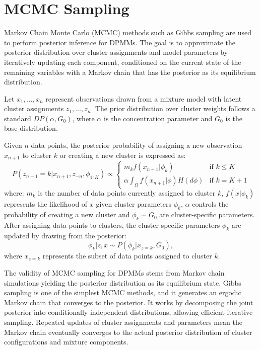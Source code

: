 
\section{MCMC Sampling}
Markov Chain Monte Carlo (MCMC) methods such as Gibbs sampling are used to perform posterior inference for DPMMs. The goal is to approximate the posterior distribution over cluster assignments and model parameters by iteratively updating each component, conditioned on the current state of the remaining variables with a Markov chain that has the posterior as its equilibrium distribution.\cite{neal2000markov}

Let \( x_1, \dots, x_n \) represent observations drawn from a mixture model with latent cluster assignments \( z_1, \dots, z_n \). The prior distribution over cluster weights follows a standard \( DP(\alpha, G_0) \), where \( \alpha \) is the concentration parameter and \( G_0 \) is the base distribution.

Given \( n \) data points, the posterior probability of assigning a new observation \( x_{n+1} \) to cluster \( k \) or creating a new cluster is expressed as:
\[
P(z_{n+1} = k | x_{n+1}, z_{-n}, \phi_{1:K}) \propto
\begin{cases}
m_k f(x_{n+1} | \phi_k) & \text{if } k \leq K \\
\alpha \int_{\Omega} f(x_{n+1} | \phi) H(d\phi) & \text{if } k = K+1
\end{cases}
\]
where: \( m_k \) is the number of data points currently assigned to cluster \( k \), \( f(x | \phi_k) \) represents the likelihood of \( x \) given cluster parameters \( \phi_k \), \( \alpha \) controls the probability of creating a new cluster and \( \phi_k \sim G_0 \) are cluster-specific parameters.\cite{neal2000markov}
After assigning data points to clusters, the cluster-specific parameters \( \phi_k \) are updated by drawing from the posterior:
\[
\phi_k | z, x \sim P(\phi_k | x_{z=k}, G_0),
\]
where \( x_{z=k} \) represents the subset of data points assigned to cluster \( k \).\cite{neal2000markov}

The validity of MCMC sampling for DPMMs stems from Markov chain simulations yielding the posterior distribution as its equilibrium state.\cite{neal2000markov} Gibbs sampling is one of the simplest MCMC methods, and it generates an ergodic Markov chain that converges to the posterior.\cite{neal2000markov} It works by decomposing the joint posterior into conditionally independent distributions, allowing efficient iterative sampling. Repeated updates of cluster assignments and parameters mean the Markov chain eventually converges to the actual posterior distribution of cluster configurations and mixture components.

